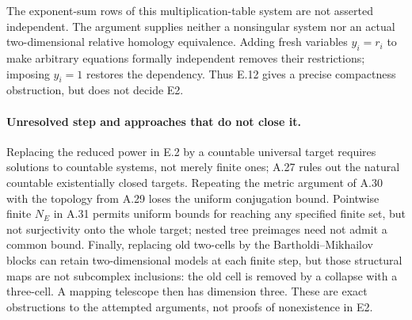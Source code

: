 The exponent-sum rows of this multiplication-table system are not
asserted independent. The argument supplies neither a nonsingular
system nor an actual two-dimensional relative homology equivalence.
Adding fresh variables $y_i=r_i$ to make arbitrary equations
formally independent removes their restrictions; imposing $y_i=1$
restores the dependency. Thus E.12 gives a precise compactness
obstruction, but does not decide E2.

\paragraph{Unresolved step and approaches that do not close it.}
Replacing the reduced power in E.2 by a countable
universal target requires solutions to countable
systems, not merely finite ones; A.27 rules out
the natural countable existentially closed
targets. Repeating the metric argument of
A.30 with the topology from A.29 loses the
uniform conjugation bound. Pointwise finite
$N_E$ in A.31 permits uniform bounds for
reaching any specified finite set, but not
surjectivity onto the whole target; nested
tree preimages need not admit a common bound.
Finally, replacing old two-cells by the
Bartholdi--Mikhailov blocks can retain
two-dimensional models at each finite step,
but those structural maps are not subcomplex
inclusions: the old cell is removed by a
collapse with a three-cell. A mapping telescope
then has dimension three. These are exact
obstructions to the attempted arguments,
not proofs of nonexistence in E2.
